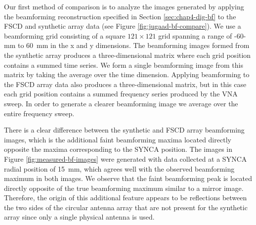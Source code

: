 Our first method of comparison is to analyze the images generated by applying the beamforming reconstruction specified in Section \ref{sec:chap4-dig-bf} to the FSCD and synthetic array data (see Figure \ref{fig:jugaad-bf-compare}). We use a beamforming grid consisting of a square $121\times121$ grid spanning a range of -60-mm to 60~mm in the x and y dimensions. The beamforming images formed from the synthetic array produces a three-dimensional matrix where each grid position contains a summed time series. We form a single beamforming image from this matrix by taking the average over the time dimension. Applying beamforming to the FSCD array data also produces a three-dimensional matrix, but in this case each grid position contains a summed frequency series produced by the VNA sweep. In order to generate a clearer beamforming image we average over the entire frequency sweep.

There is a clear difference between the synthetic and FSCD array beamforming images, which is the additional faint beamforming maxima located directly opposite the maxima corresponding to the SYNCA position. The images in Figure \ref{fig:measured-bf-images} were generated with data collected at a SYNCA radial position of 15~mm, which agrees well with the observed beamforming maximum in both images. We observe that the faint beamforming peak is located directly opposite of the true beamforming maximum similar to a mirror image. Therefore, the origin of this additional feature appears to be reflections between the two sides of the circular antenna array that are not present for the synthetic array since only a single physical antenna is used.


